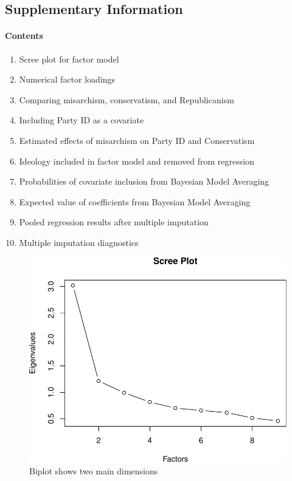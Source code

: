 \documentclass[12pt,]{article}
\begin{document}
\pagebreak

\subsection{Supplementary Information}\label{supplementary-information}

\paragraph{Contents}\label{contents}

\begin{enumerate}
\def\labelenumi{\arabic{enumi}.}
\itemsep1pt\parskip0pt
\item
  Scree plot for factor model
\item
  Numerical factor loadings
\item
  Comparing misarchism, conservatism, and Republicanism
\item
  Including Party ID as a covariate
\item
  Estimated effects of misarchism on Party ID and Conservatism
\item
  Ideology included in factor model and removed from regression
\item
  Probabilities of covariate inclusion from Bayesian Model Averaging
\item
  Expected value of coefficients from Bayesian Model Averaging
\item
  Pooled regression results after multiple imputation
\item
  Multiple imputation diagnostics
\end{enumerate}

\begin{figure}[htbp]
\centering
\includegraphics{figures/scree-1.pdf}
\caption{Biplot shows two main dimensions}
\end{figure}
\end{document}
